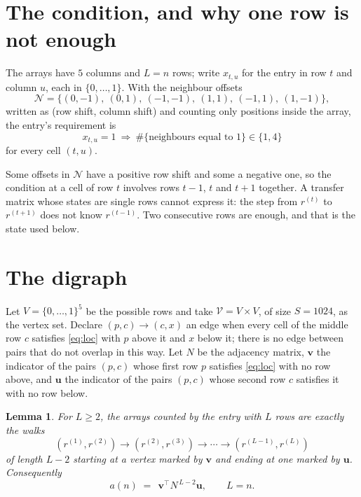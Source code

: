 \documentclass[11pt,a4paper]{article}
\theoremstyle{plain}
\newtheorem{lemma}[theorem]{Lemma}
\theoremstyle{definition}
\begin{document}
\section{The condition, and why one row is not enough}

The arrays have $5$ columns and $L=n$ rows; write $x_{t,u}$ for the entry in
row $t$ and column $u$, each in $\{0,\dots,1\}$. With the neighbour offsets
\[
\mathcal N=\{(0,-1),\ (0,1),\ (-1,-1),\ (1,1),\ (-1,1),\ (1,-1)\},
\]
written as (row shift, column shift) and counting only positions inside the array, the
entry's requirement is
\begin{equation}\label{eq:loc}
x_{t,u}=1\ \Rightarrow\ \#\{\text{neighbours equal to }1\}\in\{1,4\}
\end{equation}
for every cell $(t,u)$.

Some offsets in $\mathcal N$ have a positive row shift and some a negative one, so the
condition at a cell of row $t$ involves rows $t-1$, $t$ and $t+1$ together. A transfer
matrix whose states are single rows cannot express it: the step from $r^{(t)}$ to
$r^{(t+1)}$ does not know $r^{(t-1)}$. Two consecutive rows are enough, and that is
the state used below.

\section{The digraph}

Let $V=\{0,\dots,1\}^{5}$ be the possible rows and take
$\mathcal V=V\times V$, of size $S=1024$, as the vertex set. Declare $(p,c)\to(c,x)$ an edge
when every cell of the middle row $c$ satisfies \eqref{eq:loc} with $p$ above it and $x$
below it; there is no edge between pairs that do not overlap in this way. Let $N$ be the
adjacency matrix, $\mathbf{v}$ the indicator of the pairs $(p,c)$ whose first row $p$
satisfies \eqref{eq:loc} with no row above, and $\mathbf{u}$ the indicator of
the pairs $(p,c)$ whose second row $c$ satisfies it with no row below.

\begin{lemma}\label{lem:walk}
For $L\ge2$, the arrays counted by the entry with $L$ rows are exactly the walks
\[
(r^{(1)},r^{(2)})\to(r^{(2)},r^{(3)})\to\cdots\to(r^{(L-1)},r^{(L)})
\]
of length $L-2$ starting at a vertex marked by $\mathbf{v}$ and ending at one marked by
$\mathbf{u}$. Consequently
\[
a(n)\;=\;\,\mathbf{v}^{\!\top}N^{\,L-2}\mathbf{u},\qquad L=n .
\]
\end{lemma}
\end{document}
